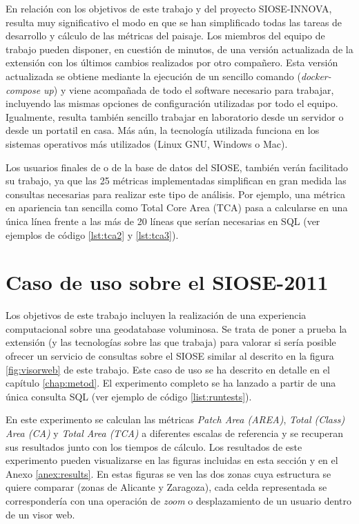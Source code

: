 En relación con los objetivos de este trabajo y del proyecto SIOSE-INNOVA, resulta muy significativo el modo en que se han simplificado todas las tareas de desarrollo y cálculo de las métricas del paisaje. Los miembros del equipo de trabajo pueden disponer, en cuestión de minutos, de una versión actualizada de la extensión \pgland{} con los últimos cambios realizados por otro compañero. Esta versión actualizada se obtiene mediante la ejecución de un sencillo comando (\textit{docker-compose up}) y viene acompañada de todo el software necesario para trabajar, incluyendo las mismas opciones de configuración utilizadas por todo el equipo. Igualmente, resulta también sencillo trabajar en laboratorio desde un servidor o desde un portatil en casa. Más aún, la tecnología utilizada funciona en los sistemas operativos más utilizados (Linux GNU, Windows o Mac). 

Los usuarios finales de \pgland{} o de la base de datos del SIOSE, también verán facilitado su trabajo, ya que las 25 métricas implementadas simplifican en gran medida las consultas necesarias para realizar este tipo de análisis. Por ejemplo, una métrica en apariencia tan sencilla como Total Core Area (TCA) pasa a calcularse en una única línea frente a las más de 20 líneas que serían necesarias en SQL (ver ejemplos de código \ref{lst:tca2} y \ref{lst:tca3}).

\section{Caso de uso sobre el SIOSE-2011 \label{sec:caso_uso}}

Los objetivos de este trabajo incluyen la realización de una experiencia computacional sobre una geodatabase voluminosa. Se trata de poner a prueba la extensión \pgland{} (y las tecnologías sobre las que trabaja) para valorar si sería posible ofrecer un servicio de consultas sobre el SIOSE similar al descrito en la figura \ref{fig:visorweb} de este trabajo. Este caso de uso se ha descrito en detalle en el capítulo \ref{chap:metod}. El experimento completo se ha lanzado a partir de una única consulta SQL (ver ejemplo de código \ref{list:runtests}).

En este experimento se calculan las métricas \textit{Patch Area (AREA)}, \textit{Total (Class) Area (CA)} y \textit{Total Area (TCA)} a diferentes escalas de referencia y se recuperan sus resultados junto con los tiempos de cálculo. Los resultados de este experimento pueden visualizarse en las figuras incluidas en esta sección y en el Anexo \ref{anex:results}. En estas figuras se ven las dos zonas cuya estructura se quiere comparar (zonas de Alicante y Zaragoza), cada celda representada se correspondería con una operación de \textit{zoom} o desplazamiento de un usuario dentro de un visor web.

